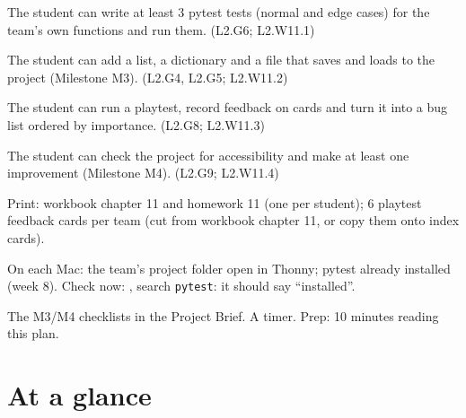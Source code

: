 
\begin{objectives}
  \item The student can write at least 3 pytest tests (normal and edge cases) for the team's own functions and run them. (L2.G6; L2.W11.1)
  \item The student can add a list, a dictionary and a file that saves and loads to the project (Milestone M3). (L2.G4, L2.G5; L2.W11.2)
  \item The student can run a playtest, record feedback on cards and turn it into a bug list ordered by importance. (L2.G8; L2.W11.3)
  \item The student can check the project for accessibility and make at least one improvement (Milestone M4). (L2.G9; L2.W11.4)
\end{objectives}

\begin{materials}
  \item Print: workbook chapter 11 and homework 11 (one per student); 6 playtest feedback cards per team (cut from workbook chapter 11, or copy them onto index cards).
  \item On each Mac: the team's project folder open in Thonny; pytest already installed (week 8). Check now: , search \texttt{pytest}: it should say \enquote{installed}.
  \item The M3/M4 checklists in the Project Brief. A timer. Prep: 10 minutes reading this plan.
\end{materials}

\section{At a glance}
\begin{timeplan}
\end{timeplan}

